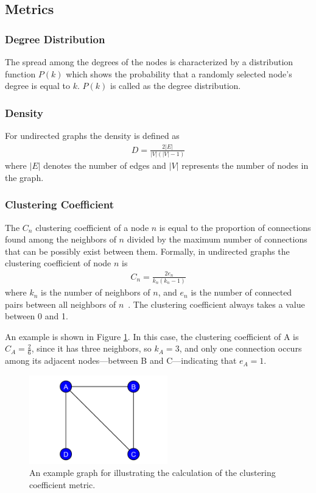 \subsection{Metrics}

\subsubsection{Degree Distribution}

The spread among the degrees of the nodes is characterized by a distribution function $P(k)$ which shows the probability that a randomly selected node's degree is equal to $k$. $P(k)$ is called as the degree distribution.

\subsubsection{Density}

For undirected graphs the density is defined as
\begin{align}
	D = \frac{2 |E|}{|V| (|V|-1)}
\end{align}
where $|E|$ denotes the number of edges and $|V|$ represents the number of nodes in the graph.

\subsubsection{Clustering Coefficient}

The $C_n$ clustering coefficient of a node $n$ is equal to the proportion of connections found among the neighbors of $n$ divided by the maximum number of connections that can be possibly exist between them. Formally, in undirected graphs the clustering coefficient of node $n$ is 
\begin{align}
	C_n = \frac{2e_n}{k_n(k_n-1) }
\end{align}
where $k_n$ is the number of neighbors of $n$, and $e_n$ is the number of connected pairs between all neighbors of $n$~\cite{clustering_formula}. The clustering coefficient always takes a value between 0 and 1.

An example is shown in Figure \ref{fig:clustering}. In this case, the clustering coefficient of \textsf{A} is $C_A = \frac{2}{6}$, since it has three neighbors, so $k_A = 3$, and only one connection occurs among its adjacent nodes---between \textsf{B} and \textsf{C}---indicating that $e_A = 1$.
\begin{figure}[!ht]
	\centering
	\includegraphics[width=60mm, keepaspectratio]{figures/clustering.pdf}
	\caption{An example graph for illustrating the calculation of the clustering coefficient metric.}
	\label{fig:clustering}
\end{figure}

